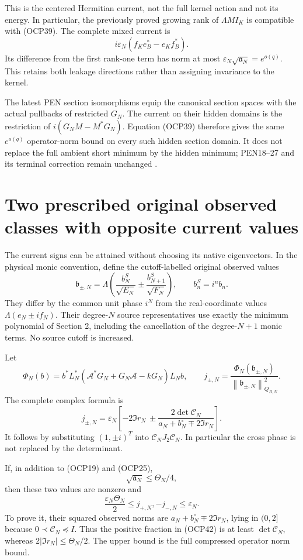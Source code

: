 \documentclass[11pt]{article}
\newcommand{\eps}{\varepsilon}
\newcommand{\norm}[1]{\left\lVert#1\right\rVert}
\begin{document}
This is the centered Hermitian current, not the full kernel action and not its energy. In particular, the previously proved growing rank of $\Lambda MI_K$ is compatible with (OCP39). The complete mixed current is
\[
 i\eps_N(f_Ke_B^*-e_Kf_B^*).
\]
Its difference from the first rank-one term has norm at most $\eps_N\sqrt{\mathfrak a_N}=e^{o(q)}$. This retains both leakage directions rather than assigning invariance to the kernel.

The latest PEN section isomorphisms equip the canonical section spaces with the actual pullbacks of restricted $G_N$. The current on their hidden domains is the restriction of $i(G_NM-M^*G_N)$. Equation (OCP39) therefore gives the same $e^{o(q)}$ operator-norm bound on every such hidden section domain. It does not replace the full ambient short minimum by the hidden minimum; PEN18--27 and its terminal correction remain unchanged \cite{pen}.

\section[Prescribed signed observed classes]{Two prescribed original observed classes with opposite current values}
The current signs can be attained without choosing its native eigenvectors. In the physical monic convention, define the cutoff-labelled original observed values
\[
 \mathfrak b_{\pm,N}
 =\Lambda\left(\frac{b_N^S}{\sqrt{E_N}}
 \pm\frac{b_{N+1}^S}{\sqrt{F_N}}\right),
 \qquad b_n^S=i^nb_n.
 \tag{OCP41}
\]
They differ by the common unit phase $i^N$ from the real-coordinate values $\Lambda(e_N\pm if_N)$. Their degree-$N$ source representatives use exactly the minimum polynomial of Section 2, including the cancellation of the degree-$N+1$ monic terms. No source cutoff is increased.

Let
\[
 \Phi_N(b)=b^*L_N^*(\mathscr A^*G_N+G_N\mathscr A-kG_N)L_Nb,
 \qquad j_{\pm,N}=\frac{\Phi_N(\mathfrak b_{\pm,N})}
 {\norm{\mathfrak b_{\pm,N}}_{Q_{B,N}}^2}.
\]
The complete complex formula is
\[
 \boxed{j_{\pm,N}=\eps_N\left[
 -2\Im r_N\ \pm\frac{2\det\mathcal C_N}
 {a_N+b_N^{\circ}\mp2\Im r_N}\right].}
 \tag{OCP42}
\]
It follows by substituting $(1,\pm i)^T$ into $\mathcal C_NJ_2\mathcal C_N$. In particular the cross phase is not replaced by the determinant.

If, in addition to (OCP19) and (OCP25),
\[
 \sqrt{\mathfrak a_N}\le\Theta_N/4,
 \tag{OCP43}
\]
then these two values are nonzero and
\[
 \boxed{\frac{\eps_N\Theta_N}{2}
 \le j_{+,N},-j_{-,N}\le\eps_N.}
 \tag{OCP44}
\]
To prove it, their squared observed norms are
$a_N+b_N^{\circ}\mp2\Im r_N$, lying in $(0,2]$ because $0\prec\mathcal C_N\preceq I$. Thus the positive fraction in (OCP42) is at least $\det\mathcal C_N$, whereas $2|\Im r_N|\le\Theta_N/2$. The upper bound is the full compressed operator norm bound.
\end{document}
